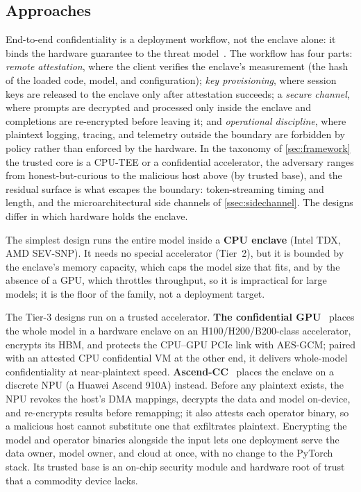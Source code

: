 \subsection{Approaches}
End-to-end confidentiality is a deployment workflow, not the enclave alone: it binds the hardware
guarantee to the threat model~\citep{andreoletti_ppi_practice}. The workflow has four
parts: \emph{remote attestation}, where the client verifies the enclave's measurement (the hash
of the loaded code, model, and configuration); \emph{key provisioning}, where session keys are
released to the enclave only after attestation succeeds; a \emph{secure channel}, where prompts
are decrypted and processed only inside the enclave and completions are re-encrypted before
leaving it; and \emph{operational discipline}, where plaintext logging, tracing, and telemetry
outside the boundary are forbidden by policy rather than enforced by the hardware. In the taxonomy
of \cref{sec:framework} the trusted core is a CPU-TEE or a confidential accelerator, the
adversary ranges from honest-but-curious to the malicious host above (by trusted base), and the residual
surface is what escapes the boundary: token-streaming timing and length, and the
microarchitectural side channels of \cref{ssec:sidechannel}. The designs differ in which
hardware holds the enclave.

The simplest design runs the entire model inside a \textbf{CPU enclave} (Intel TDX, AMD
SEV-SNP). It needs no special accelerator (Tier~2), but it is bounded by the enclave's memory
capacity, which caps the model size that fits, and by the absence of a GPU, which throttles
throughput, so it is impractical for large models; it is the floor of the family, not a
deployment target.

The Tier-3 designs run on a trusted accelerator. \textbf{The confidential GPU}~\citep{h100cc}
places the whole model in a hardware enclave on an H100/H200/B200-class accelerator, encrypts
its HBM, and protects the CPU--GPU PCIe link with AES-GCM; paired with an attested CPU
confidential VM at the other end, it delivers whole-model confidentiality at near-plaintext
speed. \textbf{Ascend-CC}~\citep{ascend_cc} places the enclave on a discrete NPU (a Huawei Ascend 910A)
instead. Before any plaintext exists, the NPU revokes the host's DMA mappings, decrypts the data
and model on-device, and re-encrypts results before remapping; it also attests each operator
binary, so a malicious host cannot substitute one that exfiltrates plaintext. Encrypting the model
and operator binaries alongside the input lets one deployment serve the data owner, model owner,
and cloud at once, with no change to the PyTorch stack. Its trusted base is an on-chip security
module and hardware root of trust that a commodity device lacks.

